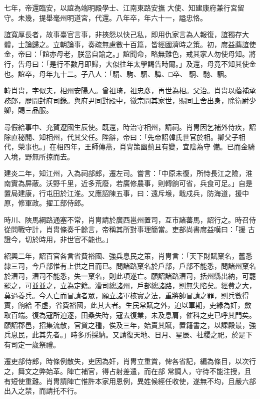 \begin{pinyinscope}
 七年，帝還臨安，以誼為端明殿學士、江南東路安撫
 大使、知建康府兼行宮留守。未幾，提舉毫州明道宮，代還。八年卒，年六十一，謚忠恪。



 誼寬厚長者，故事臺官言事，非挾怨以快己私，即用仇家言為人報復，誼獨存大體，士論歸之。立朝論事，奏疏無慮數十百篇，皆經國濟時之策。初，席益薦誼使金，帝曰：「誼亦母老，朕當自諭之。」誼聞命，略無難色，戒其家人勿使母知。將行，告母曰：「是行不數月即歸，大似往年太學謁告時爾。」及還，母竟不知其使金也。誼卒，母年九十二。子八人：「駽、駒、駟、驔、□卒、
 駉、馳、駰。



 韓肖冑，字似夫，相州安陽人。曾祖琦，祖忠彥，再世為相。父治。肖冑以蔭補承務郎，歷開封府司錄。與府尹同對殿中，徽宗問其家世，賜同上舍出身，除衛尉少卿，賜三品服。



 尋假給事中、充賀遼國生辰使。既還，時治守相州，請祠。肖冑因乞補外侍疾，詔除直秘閣、知相州，代其父任。陛辭，帝曰：「先帝詔韓氏世官於相。卿父子相代，榮事也。」在相四年，王師傳燕，肖冑策幽薊且有變，宜陰為守
 備。已而金騎入境，野無所掠而去。



 建炎二年，知江州，入為祠部郎，遷左司。嘗言：「中原未復，所恃長江之險，淮南實為屏蔽。沃野千里，近多荒廢，若廣修農事，則轉餉可省，兵食可足。」自是置局建康，行屯田於江淮。又應詔陳五事，曰：遠斥堠，戢戍兵，防海道，援中原，修軍政。擢工部侍郎。



 時川、陜馬綱路通塞不常，肖冑請於廣西邕州置司，互市諸蕃馬，詔行之。時召侍從問戰守計，肖冑條奏千餘言，帝稱其所對事理簡當。吏部尚書席益嘆曰：「援
 古證今，切於時用，非世官不能也。」



 紹興二年，詔百官各言省費裕國、強兵息民之策，肖冑言：「天下財賦窠名，舊悉隸三司，今戶部惟有上供之目而已。問諸路窠名於戶部，戶部不能悉，問諸州窠名於漕司，漕司不能悉，失一窠名，則此項遂亡。願詔諸路漕司，括州縣出納，可罷罷之，可並並之，立為定籍。漕司總諸州，戶部總諸路，則無失陷矣。經費之大，莫過養兵。今人亡而冒請者眾，願立諸軍核實之法，重將帥冒請之罪，則兵數得實，餉給
 不虛，省費裕國，此其大者。生民常賦之外，迫以軍期，吏緣為奸，斂取百端。復為寇所迫逐，田桑失時，寇去復業，未及息肩，催科之吏已呼其門矣。願詔郡邑，招集流散，官貸之種，俟及三年，始責其賦，置籍書之，以課殿最，強兵息民，此其先者。」時多所採納。又請復天地、日月、星辰、社稷之祀，於是下有司定一歲祭禮。



 遷吏部侍郎，時條例散失，吏因為奸，肖冑立重賞，俾各省記，編為條目，以次行之，舞文之弊始革。陣亡補官，得占射差遣，而在部
 常調人，守待不能注授，且有短使重難。肖冑請陣亡惟許本家用恩例，異姓候經任收使，遂無不均，且嚴六部出入之禁，而請托不行。




\end{pinyinscope}
